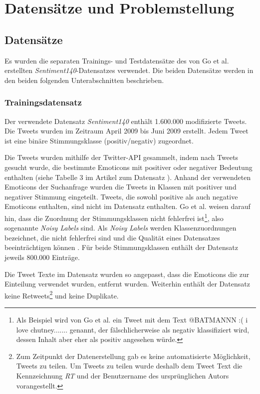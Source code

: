 \section{Datensätze und Problemstellung}\label{sec:datensätzeundproblemstellung}

\subsection{Datensätze}

Es wurden die separaten Trainings- und Testdatensätze des von Go et al. \cite{go2009twitter} erstellten \textit{Sentiment140}-Datensatzes verwendet.
Die beiden Datensätze werden in den beiden folgenden Unterabschnitten beschrieben.

\subsubsection{Trainingsdatensatz}\label{subsec:trainingsdatensatz}
Der verwendete Datensatz \textit{Sentiment140} enthält 1.600.000 modifizierte Tweets.
Die Tweets wurden im Zeitraum April 2009 bis Juni 2009 erstellt.
Jedem Tweet ist eine binäre Stimmungsklasse (positiv/negativ) zugeordnet.

Die Tweets wurden mithilfe der Twitter-API gesammelt, indem nach Tweets gesucht wurde, die bestimmte Emoticons mit positiver oder negativer Bedeutung enthalten (siehe Tabelle 3 im Artikel zum Datensatz \cite[S. 4]{go2009twitter}).
Anhand der verwendeten Emoticons der Suchanfrage wurden die Tweets in Klassen mit positiver und negativer Stimmung eingeteilt.
Tweets, die sowohl positive als auch negative Emoticons enthalten, sind nicht im Datensatz enthalten.
Go et al. \cite{go2009twitter} weisen darauf hin, dass die Zuordnung der Stimmungsklassen nicht fehlerfrei ist\footnote{
    Als Beispiel wird von Go et al. \cite{go2009twitter} ein Tweet mit dem Text \glqq @BATMANNN :( i love chutney.......\grqq{} genannt, der fälschlicherweise als negativ klassifiziert wird, dessen Inhalt aber eher als positiv angesehen würde.
}, also sogenannte \textit{Noisy Labels} sind.
Als \textit{Noisy Labels} werden Klassenzuordnungen bezeichnet, die nicht fehlerfrei sind und die Qualität eines Datensatzes beeinträchtigen können \cite{song2022learning}.
Für beide Stimmungsklassen enthält der Datensatz jeweils 800.000 Einträge.

Die Tweet Texte im Datensatz wurden so angepasst, dass die Emoticons die zur Einteilung verwendet wurden, entfernt wurden.
Weiterhin enthält der Datensatz keine Retweets\footnote{
    Zum Zeitpunkt der Datenerstellung gab es keine automatisierte Möglichkeit, Tweets zu teilen.
    Um Tweets zu teilen wurde deshalb dem Tweet Text die Kennzeichnung \textit{RT} und der Benutzername des ursprünglichen Autors vorangestellt.
} und keine Duplikate.

